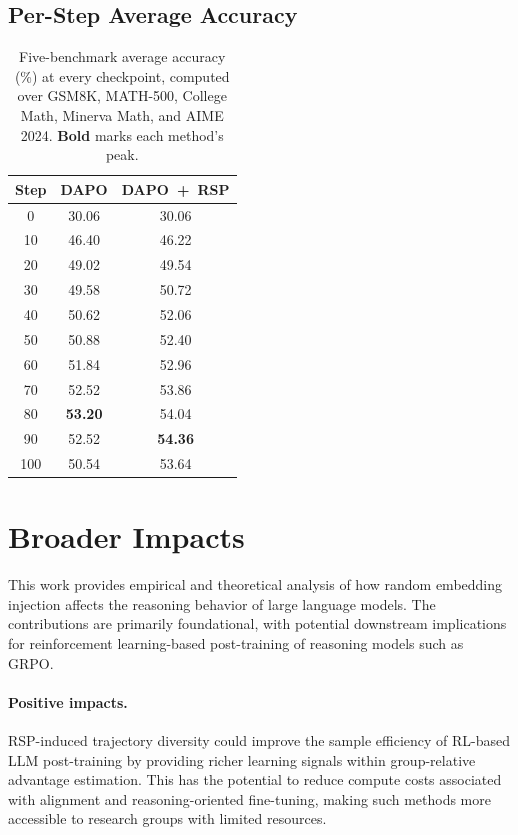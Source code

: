 \subsection{Per-Step Average Accuracy}

\begin{table}[H]
\centering
\caption{Five-benchmark average accuracy (\%) at every checkpoint, computed over GSM8K, MATH-500, College Math, Minerva Math, and AIME 2024. \textbf{Bold} marks each method's peak.}
\label{tab:dapo_per_step}
\footnotesize
\setlength{\tabcolsep}{6pt}
\renewcommand{\arraystretch}{0.9}
\begin{tabular}{c c c}
\toprule
\textbf{Step} & \textbf{DAPO} & \textbf{DAPO~+~RSP} \\
\midrule
0   & 30.06 & 30.06 \\
10  & 46.40 & 46.22 \\
20  & 49.02 & 49.54 \\
30  & 49.58 & 50.72 \\
40  & 50.62 & 52.06 \\
50  & 50.88 & 52.40 \\
60  & 51.84 & 52.96 \\
70  & 52.52 & 53.86 \\
80  & \textbf{53.20} & 54.04 \\
90  & 52.52 & \textbf{54.36} \\
100 & 50.54 & 53.64 \\
\bottomrule
\end{tabular}
\end{table}

\section{Broader Impacts}\label{app:broader_impacts}

This work provides empirical and theoretical analysis of how random embedding injection affects the reasoning behavior of large language models. The contributions are primarily foundational, with potential downstream implications for reinforcement learning-based post-training of reasoning models such as GRPO.

\paragraph{Positive impacts.}
RSP-induced trajectory diversity could improve the sample efficiency of RL-based LLM post-training by providing richer learning signals within group-relative advantage estimation. This has the potential to reduce compute costs associated with alignment and reasoning-oriented fine-tuning, making such methods more accessible to research groups with limited resources.

